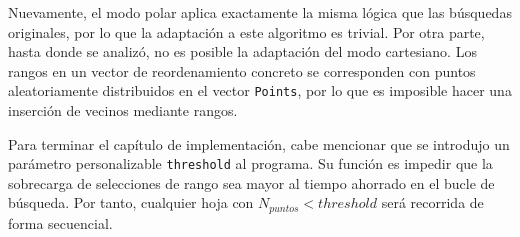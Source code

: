 Nuevamente, el modo polar aplica exactamente la misma lógica que las búsquedas originales, por lo que la adaptación a este algoritmo es trivial. Por otra parte, hasta donde se analizó, no es posible la adaptación del modo cartesiano. Los rangos en un vector de reordenamiento concreto se corresponden con puntos aleatoriamente distribuidos en el vector \texttt{Points}, por lo que es imposible hacer una inserción de vecinos mediante rangos.

Para terminar el capítulo de implementación, cabe mencionar que se introdujo un parámetro personalizable \texttt{threshold} al programa. Su función es impedir que la sobrecarga de selecciones de rango sea mayor al tiempo ahorrado en el bucle de búsqueda. Por tanto, cualquier hoja con $N_{puntos} < threshold$ será recorrida de forma secuencial.